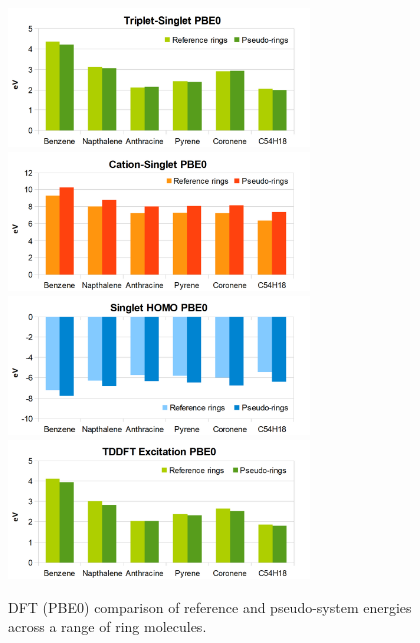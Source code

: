 \documentclass[journal=jctcce,manuscript=article]{achemso}
\begin{document}
\begin{figure}[h]
\includegraphics[width=8cm]{ring_pbe0_excitation}
\includegraphics[width=8cm]{ring_pbe0_ionisation}
\includegraphics[width=8cm]{ring_pbe0_homo}
\includegraphics[width=8cm]{ring_tddft_excitation}
\caption{DFT (PBE0) comparison of reference and pseudo-system energies across a range of ring molecules.}
\label{fig:rings_graphs}
\end{figure}
\end{document}
